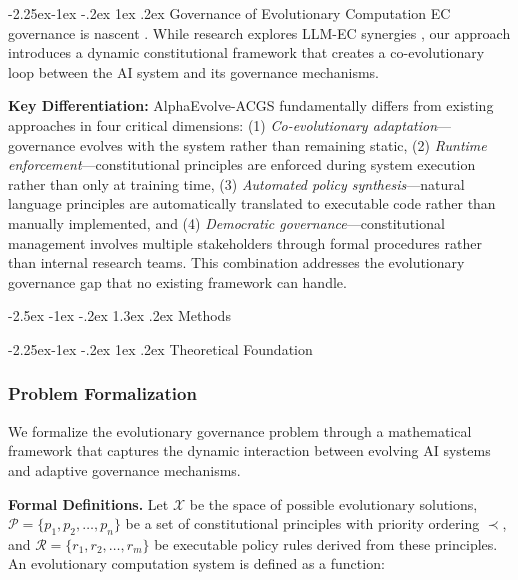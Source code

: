 \documentclass[manuscript,screen,review,anonymous,9pt]{acmart}
\makeatletter
\renewcommand\section{\@startsection{section}{1}{\z@}%
  {-2.5ex \@plus -1ex \@minus -.2ex}%
  {1.3ex \@plus.2ex}%
  {\normalfont\Large\bfseries}}
\renewcommand\subsection{\@startsection{subsection}{2}{\z@}%
  {-2.25ex\@plus -1ex \@minus -.2ex}%
  {1ex \@plus .2ex}%
  {\normalfont\large\bfseries}}
\makeatother
\begin{document}
\subsection{Governance of Evolutionary Computation}
EC governance is nascent \cite{Chauhan2025ECLLMSurvey}. While research explores LLM-EC synergies \cite{Nordin2024LLMGP}, our approach introduces a dynamic constitutional framework that creates a co-evolutionary loop between the AI system and its governance mechanisms.

\textbf{Key Differentiation:} AlphaEvolve-ACGS fundamentally differs from existing approaches in four critical dimensions: (1) \textit{Co-evolutionary adaptation}---governance evolves with the system rather than remaining static, (2) \textit{Runtime enforcement}---constitutional principles are enforced during system execution rather than only at training time, (3) \textit{Automated policy synthesis}---natural language principles are automatically translated to executable code rather than manually implemented, and (4) \textit{Democratic governance}---constitutional management involves multiple stakeholders through formal procedures rather than internal research teams. This combination addresses the evolutionary governance gap that no existing framework can handle.


\section{Methods}
\label{sec:methods}

\subsection{Theoretical Foundation}
\label{subsec:theoretical_foundation}

\subsubsection{Problem Formalization}
\label{subsubsec:problem_formalization}

We formalize the evolutionary governance problem through a mathematical framework that captures the dynamic interaction between evolving AI systems and adaptive governance mechanisms.

\textbf{Formal Definitions.} Let $\mathcal{X}$ be the space of possible evolutionary solutions, $\mathcal{P} = \{p_1, p_2, \ldots, p_n\}$ be a set of constitutional principles with priority ordering $\prec$, and $\mathcal{R} = \{r_1, r_2, \ldots, r_m\}$ be executable policy rules derived from these principles. An evolutionary computation system is defined as a function:
\end{document}
